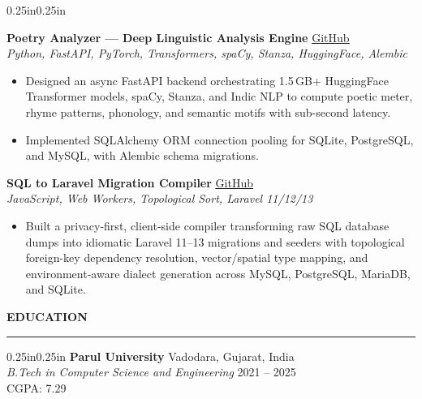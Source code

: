\documentclass[11pt,a4paper]{article}
\newcommand{\cvlink}[2]{\textcolor{linkblue}{\underline{\href{#1}{#2}}}}
\newcommand{\cvsection}[1]{%
    \vspace{10pt}
    \noindent\textbf{\large\MakeUppercase{#1}}
    \vspace{3pt}
    \hrule
    \vspace{5pt}
}
\newcommand{\projectheader}[3]{%
    \noindent\textbf{#1} \hfill #3 \\
    {\small\itshape #2}\par
    \vspace{2pt}
}
\begin{document}
\begin{adjustwidth}{0.25in}{0.25in}
\vspace{6pt}

\projectheader{Poetry Analyzer — Deep Linguistic Analysis Engine}{Python, FastAPI, PyTorch, Transformers, spaCy, Stanza, HuggingFace, Alembic}{%
  \cvlink{https://github.com/jayeshmepani/poetry-analyzer-app}{GitHub}}
\begin{itemize}[leftmargin=0.2in, itemsep=1pt, parsep=0pt, topsep=0pt]
\item Designed an async FastAPI backend orchestrating 1.5\,GB+ HuggingFace Transformer models, spaCy, Stanza, and Indic NLP to compute poetic meter, rhyme patterns, phonology, and semantic motifs with sub-second latency.
\item Implemented SQLAlchemy ORM connection pooling for SQLite, PostgreSQL, and MySQL, with Alembic schema migrations.
\end{itemize}

\vspace{6pt}

\projectheader{SQL to Laravel Migration Compiler}{JavaScript, Web Workers, Topological Sort, Laravel 11/12/13}{%
  \cvlink{https://github.com/jayeshmepani/sql-to-laravel}{GitHub}}
\begin{itemize}[leftmargin=0.2in, itemsep=1pt, parsep=0pt, topsep=0pt]
\item Built a privacy-first, client-side compiler transforming raw SQL database dumps into idiomatic Laravel 11--13 migrations and seeders with topological foreign-key dependency resolution, vector/spatial type mapping, and environment-aware dialect generation across MySQL, PostgreSQL, MariaDB, and SQLite.
\end{itemize}

\end{adjustwidth}

\cvsection{Education}
\begin{adjustwidth}{0.25in}{0.25in}
\noindent\textbf{Parul University} \hfill Vadodara, Gujarat, India \\
\textit{B.Tech in Computer Science and Engineering} \hfill 2021 -- 2025 \\
CGPA: 7.29
\end{adjustwidth}
\end{document}
